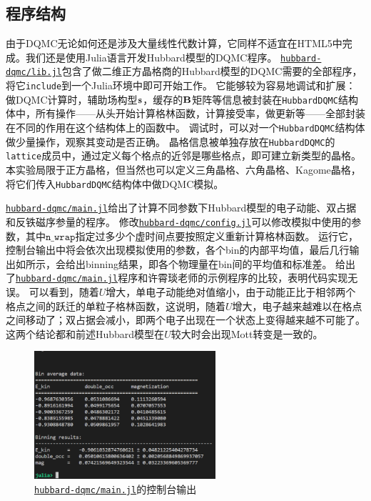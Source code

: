 \documentclass[UTF8]{ctexart}
\begin{document}
\subsection{程序结构}

由于DQMC无论如何还是涉及大量线性代数计算，它同样不适宜在HTML5中完成。我们还是使用Julia语言开发Hubbard模型的DQMC程序。%
\href{../hubbard-dqmc/lib.jl}{\texttt{hubbard-dqmc/lib.jl}}包含了做二维正方晶格商的Hubbard模型的DQMC需要的全部程序，将它\texttt{include}到一个Julia环境中即可开始工作。
它能够较为容易地调试和扩展：做DQMC计算时，辅助场构型$\vb{s}$，缓存的$\vb{B}$矩阵等信息被封装在\texttt{HubbardDQMC}结构体中，所有操作——从头开始计算格林函数，计算接受率，做更新等——全部封装在不同的作用在这个结构体上的函数中。
调试时，可以对一个\texttt{HubbardDQMC}结构体做少量操作，观察其变动是否正确。
晶格信息被单独存放在\texttt{HubbardDQMC}的\texttt{lattice}成员中，通过定义每个格点的近邻是哪些格点，即可建立新类型的晶格。
本实验局限于正方晶格，但当然也可以定义三角晶格、六角晶格、Kagome晶格，将它们传入\texttt{HubbardDQMC}结构体中做DQMC模拟。

\href{../hubbard-dqmc/main.jl}{\texttt{hubbard-dqmc/main.jl}}给出了计算不同参数下Hubbard模型的电子动能、双占据和反铁磁序参量的程序。
修改\href{../hubbard-dqmc/config.jl}{\texttt{hubbard-dqmc/config.jl}}可以修改模拟中使用的参数，其中$\texttt{n\_wrap}$指定过多少个虚时间点要按照定义重新计算格林函数。
运行它，控制台输出中将会依次出现模拟使用的参数，各个bin的内部平均值，最后几行输出如所示，会给出binning结果，即各个物理量在bin间的平均值和标准差。%
给出了\href{../hubbard-dqmc/main.jl}{\texttt{hubbard-dqmc/main.jl}}程序和许霄琰老师的示例程序的比较，表明代码实现无误。
可以看到，随着$U$增大，单电子动能绝对值缩小，由于动能正比于相邻两个格点之间的跃迁的单粒子格林函数，这说明，随着$U$增大，电子越来越难以在格点之间移动了；双占据会减小，即两个电子出现在一个状态上变得越来越不可能了。
这两个结论都和前述Hubbard模型在$U$较大时会出现Mott转变是一致的。

\begin{figure}
    \centering
    \includegraphics[width=0.6\textwidth]{../hubbard-report/main-result.PNG}
    \caption{\href{../hubbard-dqmc/main.jl}{\texttt{hubbard-dqmc/main.jl}}的控制台输出}
    \label{fig:main-output}
\end{figure}
\end{document}
